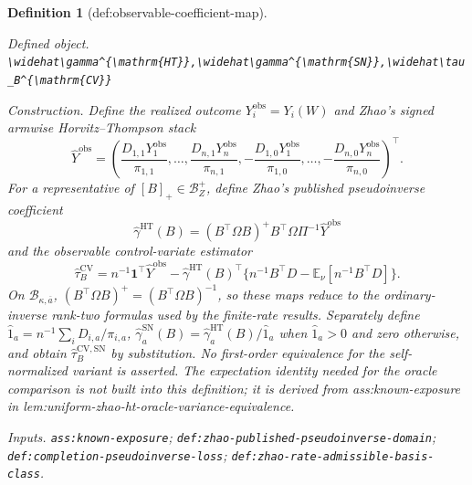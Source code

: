 \documentclass{article}
\newtheorem{definition}{Definition}
\begin{document}
\begin{definition}[def:observable-coefficient-map]\label{def:observable-coefficient-map}
\par\smallskip\noindent\emph{Defined object.} \texttt{\textbackslash{}\allowbreak{}widehat\textbackslash{}\allowbreak{}gamma\textasciicircum{}\{\textbackslash{}\allowbreak{}mathrm\{HT\}\allowbreak{}\}\allowbreak{},\allowbreak{}\textbackslash{}\allowbreak{}widehat\textbackslash{}\allowbreak{}gamma\textasciicircum{}\{\textbackslash{}\allowbreak{}mathrm\{SN\}\allowbreak{}\}\allowbreak{},\allowbreak{}\textbackslash{}\allowbreak{}widehat\textbackslash{}\allowbreak{}tau\_\allowbreak{}B\textasciicircum{}\{\textbackslash{}\allowbreak{}mathrm\{CV\}\allowbreak{}\}\allowbreak{}}
\par\smallskip\noindent\emph{Construction.} Define the realized outcome \(Y_i^{\mathrm{obs}}=Y_i(W)\) and Zhao's signed armwise Horvitz--Thompson stack
\[
\widehat Y^{\mathrm{obs}}=
\left(\frac{D_{1,1}Y_1^{\mathrm{obs}}}{\pi_{1,1}},\ldots,
\frac{D_{n,1}Y_n^{\mathrm{obs}}}{\pi_{n,1}},
-\frac{D_{1,0}Y_1^{\mathrm{obs}}}{\pi_{1,0}},\ldots,
-\frac{D_{n,0}Y_n^{\mathrm{obs}}}{\pi_{n,0}}\right)^{\top}.
\]
For a representative of \([B]_+\in\mathcal B_Z^+\), define Zhao's published pseudoinverse coefficient
\[
\widehat\gamma^{\mathrm{HT}}(B)
=(B^{\top}\Omega B)^+B^{\top}\Omega\Pi^{-1}\widehat Y^{\mathrm{obs}}
\]
and the observable control-variate estimator
\[
\widehat\tau_B^{\mathrm{CV}}
=n^{-1}\mathbf1^{\top}\widehat Y^{\mathrm{obs}}
-\widehat\gamma^{\mathrm{HT}}(B)^{\top}
\{n^{-1}B^{\top}D-\mathbb E_\nu[n^{-1}B^{\top}D]\}.
\]
On \(\mathcal B_{\kappa,\overline a}\), \((B^{\top}\Omega B)^+=(B^{\top}\Omega B)^{-1}\), so these maps reduce to the ordinary-inverse rank-two formulas used by the finite-rate results.  Separately define \(\widehat1_a=n^{-1}\sum_iD_{i,a}/\pi_{i,a}\), \(\widehat\gamma_a^{\mathrm{SN}}(B)=\widehat\gamma_a^{\mathrm{HT}}(B)/\widehat1_a\) when \(\widehat1_a>0\) and zero otherwise, and obtain \(\widehat\tau_B^{\mathrm{CV,SN}}\) by substitution.  No first-order equivalence for the self-normalized variant is asserted.  The expectation identity needed for the oracle comparison is not built into this definition; it is derived from ass:known-exposure in lem:uniform-zhao-ht-oracle-variance-equivalence.
\par\smallskip\noindent\emph{Inputs.} \texttt{ass:\allowbreak{}known-\allowbreak{}exposure}; \texttt{def:\allowbreak{}zhao-\allowbreak{}published-\allowbreak{}pseudoinverse-\allowbreak{}domain}; \texttt{def:\allowbreak{}completion-\allowbreak{}pseudoinverse-\allowbreak{}loss}; \texttt{def:\allowbreak{}zhao-\allowbreak{}rate-\allowbreak{}admissible-\allowbreak{}basis-\allowbreak{}class}.
\end{definition}
\end{document}
